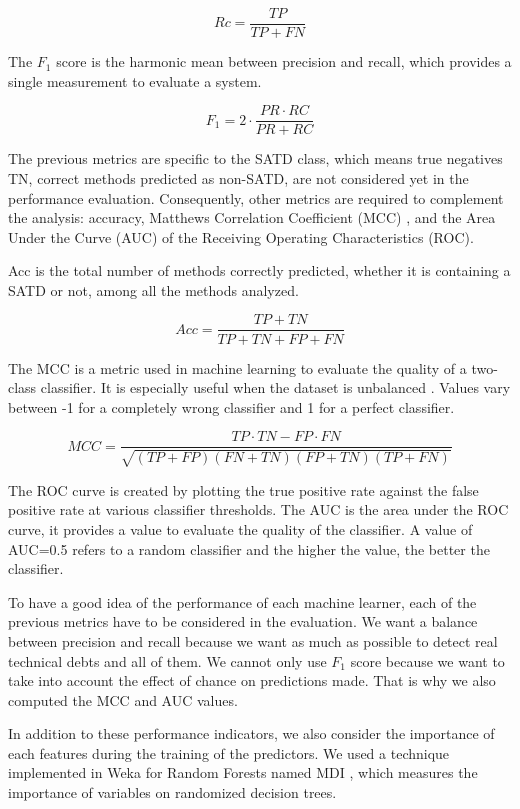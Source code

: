 \[
Rc=\frac{TP}{TP+FN}
\]

The $F_{1}$ score is the harmonic mean between precision and recall, which provides a single measurement to evaluate a system.

\[
F_1=2 \cdot \frac{PR \cdot RC}{PR + RC}
\]

The previous metrics are specific to the \ac{SATD} class, which means true negatives \ac{TN}, correct methods predicted as non-\ac{SATD}, are not considered yet in the performance evaluation. Consequently, other metrics are required to complement the analysis: accuracy, Matthews Correlation Coefficient (MCC) \citep{matthews1975comparison}, and the Area Under the Curve (AUC) of the Receiving Operating Characteristics (ROC). \par 

\ac{Acc} is the total number of methods correctly predicted, whether it is containing a \ac{SATD} or not, among all the methods analyzed.

\[
Acc=\frac{TP+TN}{TP+TN+FP+FN}
\]

The \ac{MCC} is a metric used in machine learning to evaluate the quality of a two-class classifier. It is especially useful when the dataset is unbalanced \citep{matthews1975comparison}. Values vary between -1 for a completely wrong classifier and 1 for a perfect classifier. 

\[
MCC=\frac{TP \cdot TN-FP \cdot FN}{\sqrt{(TP+FP)(FN+TN)(FP+TN)(TP+FN)}}
\]

The \ac{ROC} curve is created by plotting the true positive rate against the false positive rate at various classifier thresholds. The \ac{AUC} is the area under the ROC curve, it provides a value to evaluate the quality of the classifier. A value of AUC=0.5 refers to a random classifier and the higher the value, the better the classifier.

To have a good idea of the performance of each machine learner, each of the previous metrics have to be considered in the evaluation. We want a balance between precision and recall because we want as much as possible to detect real technical debts and all of them. We cannot only use $F_{1}$ score because we want to take into account the effect of chance on predictions made. That is why we also computed the MCC and AUC values.

In addition to these performance indicators, we also consider the importance of each features during the training of the predictors. We used a technique implemented in Weka for Random Forests named \ac{MDI} \citep{louppe2013understanding}, which measures the importance of variables on randomized decision trees.

